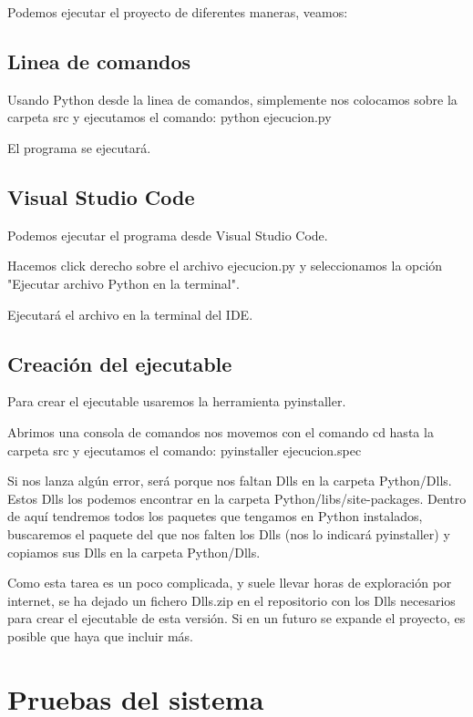 Podemos ejecutar el proyecto de diferentes maneras, veamos:

\subsection{Linea de comandos}
Usando Python desde la linea de comandos, simplemente nos colocamos sobre la carpeta src y ejecutamos el comando: python ejecucion.py 

El programa se ejecutará.

\subsection{Visual Studio Code}
Podemos ejecutar el programa desde Visual Studio Code.


Hacemos click derecho sobre el archivo ejecucion.py y seleccionamos la opción "Ejecutar archivo Python en la terminal".


Ejecutará el archivo en la terminal del IDE.

\subsection{Creación del ejecutable}
Para crear el ejecutable usaremos la herramienta pyinstaller.

Abrimos una consola de comandos nos movemos con el comando cd hasta la carpeta src y ejecutamos el comando: pyinstaller ejecucion.spec

Si nos lanza algún error, será porque nos faltan Dlls en la carpeta Python/Dlls. Estos Dlls los podemos encontrar en la carpeta Python/libs/site-packages. Dentro de aquí tendremos todos los paquetes que tengamos en Python instalados, buscaremos el paquete del que nos falten los Dlls (nos lo indicará pyinstaller) y copiamos sus Dlls en la carpeta Python/Dlls.

Como esta tarea es un poco complicada, y suele llevar horas de exploración por internet, se ha dejado un fichero Dlls.zip en el repositorio con los Dlls necesarios para crear el ejecutable de esta versión. Si en un futuro se expande el proyecto, es posible que haya que incluir más.

\section{Pruebas del sistema}

